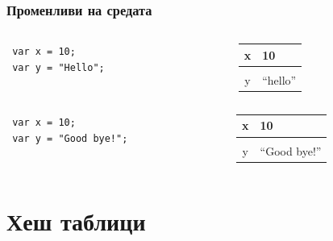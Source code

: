\documentclass{beamer}
\begin{document}
\begin{frame}[fragile]
\frametitle{Променливи на средата}

\begin{columns}[t]
  \begin{column}{0.5\textwidth}
\begin{flushleft}
\begin{lstlisting}
 var x = 10;
 var y = "Hello"; 
\end{lstlisting}
\end{flushleft}
  \end{column}

  \begin{column}{0.5\textwidth}
\begin{flushleft}
\begin{tabular} {c | l}
  x   & 10 \\
      \hline\\
  y & ``hello''

\end{tabular}  
\end{flushleft}

  \end{column}
\end{columns}


\begin{columns}[t]
  \begin{column}{0.5\textwidth}
\begin{flushleft}
\begin{lstlisting}
 var x = 10;
 var y = "Good bye!"; 
\end{lstlisting}
\end{flushleft}
  \end{column}

  \begin{column}{0.5\textwidth}
\begin{flushleft}
\begin{tabular} {c | l}
  x   & 10 \\
      \hline\\
  y & ``Good bye!''

\end{tabular}  
\end{flushleft}

  \end{column}
\end{columns}


\end{frame}


\section{Хеш таблици} 
\end{document}
